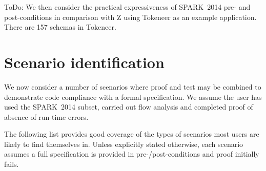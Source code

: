\documentclass{llncs}
\newcommand{\newspark}{SPARK~2014\xspace}
\begin{document}
ToDo: We then consider the practical expressiveness of \newspark pre-
and post-conditions in comparison with Z using Tokeneer as an example
application. There are 157 schemas in Tokeneer.


\section{Scenario identification}

We now consider a number of scenarios where proof and test may be
combined to demonstrate code compliance with a formal
specification. We assume the user has used the \newspark subset,
carried out flow analysis and completed proof of absence of run-time
errors.

The following list provides good coverage of the types of scenarios
most users are likely to find themselves in. Unless explicitly stated
otherwise, each scenario assumes a full specification is provided in
pre-/post-conditions and proof initially fails.
\end{document}
